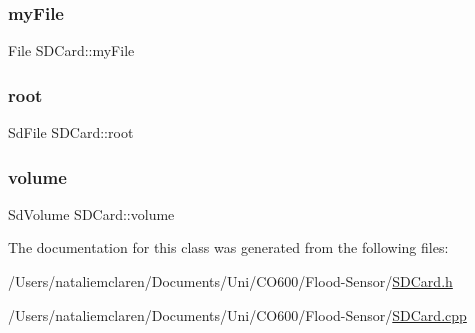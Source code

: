 \subsubsection{\texorpdfstring{my\+File}{myFile}}
{\footnotesize\ttfamily File S\+D\+Card\+::my\+File}

\mbox{\label{class_s_d_card_a6e02af8a10a45955da7c560ea148ca4d}} 
\subsubsection{\texorpdfstring{root}{root}}
{\footnotesize\ttfamily Sd\+File S\+D\+Card\+::root}

\mbox{\label{class_s_d_card_a143b4a79b09f0c1d6d71155b51dfefcb}} 
\subsubsection{\texorpdfstring{volume}{volume}}
{\footnotesize\ttfamily Sd\+Volume S\+D\+Card\+::volume}



The documentation for this class was generated from the following files\+:\begin{DoxyCompactItemize}
\item 
/\+Users/nataliemclaren/\+Documents/\+Uni/\+C\+O600/\+Flood-\/\+Sensor/\mbox{\hyperlink{_s_d_card_8h}{S\+D\+Card.\+h}}\item 
/\+Users/nataliemclaren/\+Documents/\+Uni/\+C\+O600/\+Flood-\/\+Sensor/\mbox{\hyperlink{_s_d_card_8cpp}{S\+D\+Card.\+cpp}}\end{DoxyCompactItemize}
